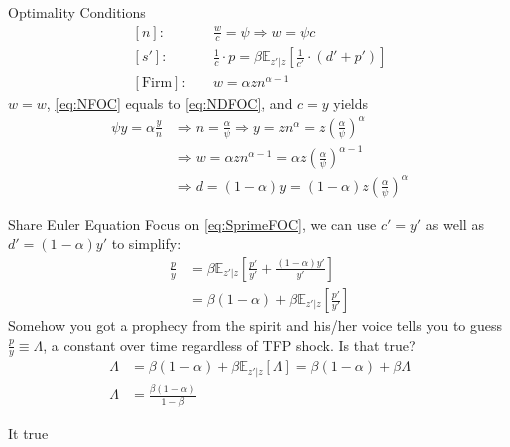 \documentclass[aspectratio=169,xcolor=dvipsnames]{beamer}
\begin{document}
\begin{frame}{Optimality Conditions}
\label{slide:Optimality_Conditions}
    \begin{align}
        \label{eq:NFOC}
        [n]: \quad
            & \frac{w}{c} = \psi \Rightarrow w = \psi c
        \\
        \label{eq:SprimeFOC}
        [s']: \quad
            & \frac{1}{c} \cdot p = \beta \mathbb{E}_{z'|z} \left[
                \frac{1}{c'} \cdot (d' + p')
            \right]
        \\
        \label{eq:NDFOC}
        [\text{Firm}]: \quad
            & w = \alpha z n^{\alpha-1}
    \end{align}
    $ w = w $, \eqref{eq:NFOC} equals to \eqref{eq:NDFOC}, and $ c = y $ yields
    \begin{align}
        \psi y = \alpha \frac{y}{n}
            & \Rightarrow n = \frac{\alpha}{\psi} \Rightarrow y = z n^{\alpha} = z \left(
                \frac{\alpha}{\psi}
            \right)^{\alpha}
        \\
            & \Rightarrow w = \alpha z n ^{\alpha-1} = \alpha z \left(
                \frac{\alpha}{\psi}
            \right)^{\alpha-1}
        \\
            & \Rightarrow d = (1-\alpha) y = (1-\alpha) z \left(
                \frac{\alpha}{\psi}
            \right)^{\alpha}
    \end{align}

\end{frame}

\begin{frame}{Share Euler Equation}
\label{slide:Share_Euler_Equation}
    Focus on \eqref{eq:SprimeFOC}, we can use $ c' = y' $ as well as $ d' = (1-\alpha) y' $ to simplify:
    \begin{align}
        \frac{p}{y}
            & = \beta \mathbb{E}_{z'|z} \left[
                \frac{p'}{y'} + \frac{(1-\alpha)y'}{y'}
            \right]
        \\
            & = \beta (1-\alpha) + \beta \mathbb{E}_{z'|z} \left[
                \frac{p'}{y'}
            \right]
    \end{align}
    Somehow you got a prophecy from the spirit and his/her voice tells you to guess $ \displaystyle \frac{p}{y} \equiv \Lambda $, a constant over time regardless of TFP shock. Is that true?
    \begin{align}
        \Lambda
            & = \beta (1-\alpha) + \beta \mathbb{E}_{z'|z} \left[
                \Lambda
            \right] = \beta(1-\alpha) + \beta \Lambda
        \\
        \Lambda
            & = \frac{\beta(1-\alpha)}{1-\beta}
    \end{align}
    \begin{center}
        It true \faAngellist \faAngellist \faAngellist
    \end{center}
\end{frame}
\end{document}
